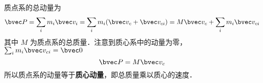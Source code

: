 
质点系的总动量为
\begin{equation}
\bvec P = \sum_i m_i \bvec v_i  = \sum_i m_i (\bvec v_c + \bvec v_{ci})  = M \bvec v_c + \sum_i  m_i \bvec v_{ci} 
\end{equation}
其中 $M$ 为质点系的总质量．注意到质心系中的动量为零， $\sum_i  m_i \bvec v_{ci}  = \bvec 0$
\begin{equation}\label{SysP_eq2}
\bvec P = M \bvec v_c
\end{equation}
所以质点系的动量等于\textbf{质心动量}，即总质量乘以质心的速度．
